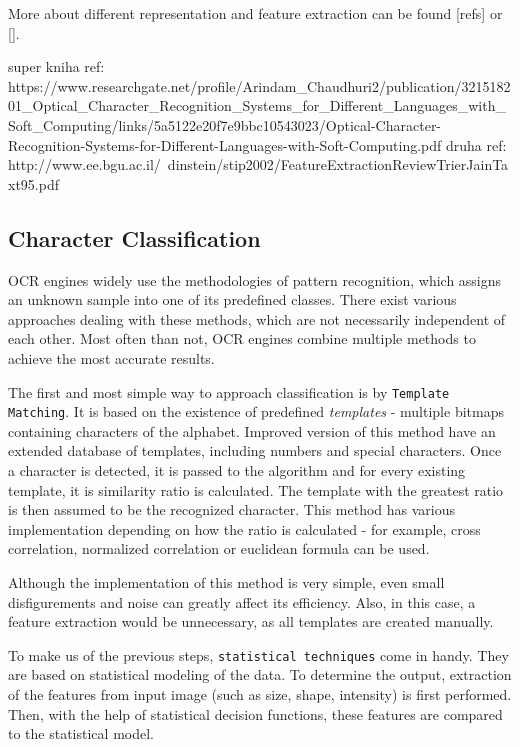 More about different representation and feature extraction can be found [refs] or [].

super kniha ref: 
https://www.researchgate.net/profile/Arindam_Chaudhuri2/publication/321518201_Optical_Character_Recognition_Systems_for_Different_Languages_with_Soft_Computing/links/5a5122e20f7e9bbc10543023/Optical-Character-Recognition-Systems-for-Different-Languages-with-Soft-Computing.pdf
druha ref: http://www.ee.bgu.ac.il/~dinstein/stip2002/FeatureExtractionReviewTrierJainTaxt95.pdf

\subsection{Character Classification}

OCR engines widely use the methodologies of pattern recognition, which assigns an unknown sample into one of its predefined classes. There exist various approaches dealing with these methods, which are not necessarily independent of each other. Most often than not, OCR engines combine multiple methods to achieve the most accurate results.

The first and most simple way to approach classification is by \texttt{Template Matching}. It is based on the existence of predefined \emph{templates} - multiple bitmaps containing characters of the alphabet. Improved version of this method have an extended database of templates, including numbers and special characters. Once a character is detected, it is passed to the algorithm and for every existing template, it is similarity ratio is calculated. The template with the greatest ratio is then assumed to be the recognized character. This method has various implementation depending on how the ratio is calculated - for example, cross correlation, normalized correlation or euclidean formula can be used.

Although the implementation of this method is very simple, even small disfigurements and noise can greatly affect its efficiency. Also, in this case, a feature extraction would be unnecessary, as all templates are created manually.

To make us of the previous steps, \texttt{statistical techniques} come in handy. They are based on statistical modeling of the data. To determine the output, extraction of the features from input image (such as size, shape, intensity) is first performed. Then, with the help of statistical decision functions, these features are compared to the statistical model.

